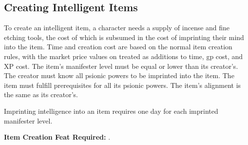 \subsection{Creating Intelligent Items}
To create an intelligent item, a character needs a supply of incense and fine etching tools, the cost of which is subsumed in the cost of imprinting their mind into the item. Time and creation cost are based on the normal item creation rules, with the market price values on  treated as additions to time, gp cost, and XP cost. The item's manifester level must be equal or lower than its creator's. The creator must know all psionic powers to be imprinted into the item. The item must fulfill prerequisites for all its psionic powers. The item's alignment is the same as its creator's.

Imprinting intelligence into an item requires one day for each imprinted manifester level.

\textbf{Item Creation Feat Required:} .

